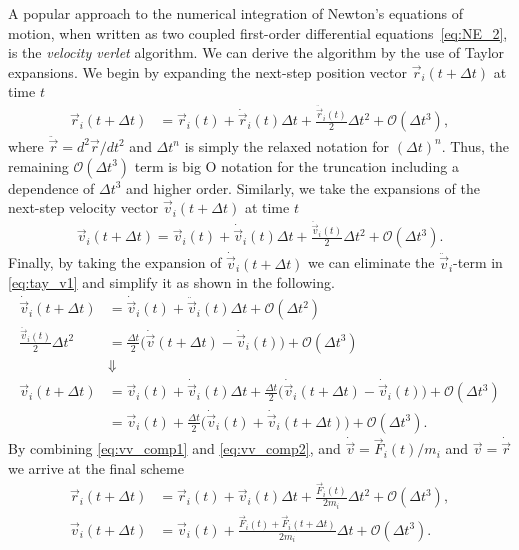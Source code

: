 A popular approach to the numerical integration of Newton's equations of motion, when written as two coupled first-order differential equations~\cref{eq:NE_2}, is the \textit{velocity verlet} algorithm. We can derive the algorithm by the use of Taylor expansions. We begin by expanding the next-step position vector $\vec{r}_i(t + \Delta t)$ at time $t$
\begin{align}
  \vec{r}_i(t + \Delta t) &= \vec{r}_i(t) + \dot{\vec{r}}_i(t) \Delta t + \frac{\ddot{\vec{r}}_i(t)}{2} \Delta t^2 + \mathcal{O}(\Delta t^3) \label{eq:vv_comp1},
\end{align}
where $\ddot{\vec{r}} = d^2\vec{r}/dt^2$ and $\Delta t^n$ is simply the relaxed
notation for $(\Delta t)^n$. Thus, the remaining $\mathcal{O}(\Delta t^3)$ term is big O notation for the truncation including a dependence of $\Delta t^3$ and higher order. Similarly, we take the expansions of the next-step
velocity vector $\vec{v}_i(t+\Delta t)$ at time $t$ 
\begin{align}
  \vec{v}_i(t+\Delta t) = \vec{v}_i(t) + \dot{\vec{v}}_i(t) \Delta t + \frac{\ddot{\vec{v}}_i(t)}{2}\Delta t^2 + \mathcal{O}(\Delta t^3).
  \label{eq:tay_v1}
\end{align}
Finally, by taking the expansion of $\dot{\vec{v}}_i(t+\Delta t)$ we can
eliminate the $\ddot{\vec{v}}_i$-term in \cref{eq:tay_v1} and simplify it as
shown in the following.
\begin{align}
  \dot{\vec{v}}_i(t+\Delta t) &= \dot{\vec{v}}_i(t) + \ddot{\vec{v}}_i(t) \Delta t + \mathcal{O}(\Delta t^2) \nonumber \\
  \frac{\ddot{\vec{v}}_i(t)}{2}\Delta t^2 &= \frac{\Delta t}{2}\Big( \dot{\vec{v}}(t+\Delta t) - \dot{\vec{v}}_i(t)\Big) + \mathcal{O}(\Delta t^3) \nonumber \\
  &\Downarrow \nonumber \\
  \vec{v}_i(t+\Delta t) &= \vec{v}_i(t) + \dot{\vec{v}}_i(t) \Delta t + \frac{\Delta t}{2}\Big( \dot{\vec{v}}_i(t+\Delta t) - \dot{\vec{v}}_i(t)\Big) + \mathcal{O}(\Delta t^3) \nonumber \\
  &=  \vec{v}_i(t) + \frac{\Delta t}{2}\Big( \dot{\vec{v}}_i(t) +  \dot{\vec{v}}_i(t+\Delta t)\Big) + \mathcal{O}(\Delta t^3).
  \label{eq:vv_comp2}
\end{align}
By combining \cref{eq:vv_comp1} and \cref{eq:vv_comp2}, and $\dot{\vec{v}} = \vec{F}_i(t)/m_i$ and $\vec{v} = \dot{\vec{r}}$ we
arrive at the final scheme
\begin{align*}
  \vec{r}_i(t + \Delta t) &= \vec{r}_i(t) + \vec{v}_i(t) \Delta t + \frac{\vec{F}_i(t)}{2m_i}\Delta t^2 + \mathcal{O}(\Delta t^3), \\
  \vec{v}_i(t+\Delta t)  &= \vec{v}_i(t) + \frac{\vec{F}_i(t) + \vec{F}_i(t+\Delta t)}{2m_i}  \Delta t + \mathcal{O}(\Delta t^3).
\end{align*}

